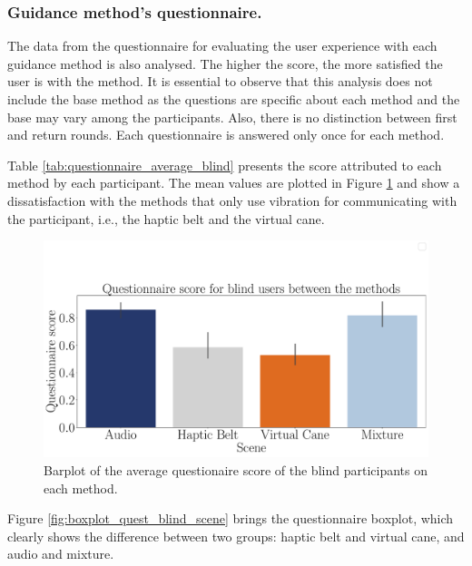 \subsubsection{Guidance method's questionnaire.}
\label{subsubsec:results_questionnaires}

The data from the questionnaire for evaluating the user experience with each guidance method is also analysed. The higher the score, the more satisfied the user is with the method. It is essential to observe that this analysis does not include the base method as the questions are specific about each method and the base may vary among the participants. Also, there is no distinction between first and return rounds. Each questionnaire is answered only once for each method.

Table \ref{tab:questionnaire_average_blind} presents the score attributed to each method by each participant. The mean values are plotted in Figure \ref{fig:barplot_questionnaire_scene_blind} and show a dissatisfaction with the methods that only use vibration for communicating with the participant, i.e., the haptic belt and the virtual cane. 



\begin{figure}[!htb]
    \centering
    \includegraphics[width = \textwidth]{Resultados/Questionario/Figuras/pdf/barplot_questionnaire_scene_blind.pdf}
    \caption{Barplot of the average questionaire score of the blind participants on each method.}
    \label{fig:barplot_questionnaire_scene_blind}
\end{figure}

Figure \ref{fig:boxplot_quest_blind_scene} brings the questionnaire boxplot, which clearly shows the difference between two groups: haptic belt and virtual cane, and audio and mixture. 

